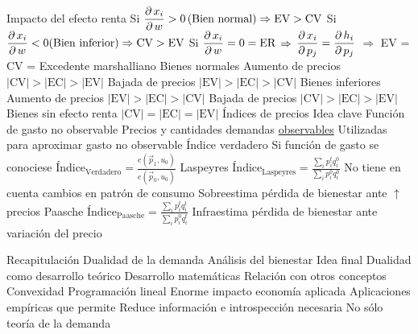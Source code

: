 \documentclass{nuevotema}
\begin{document}
\begin{esquemal}
			\3 Impacto del efecto renta
				\4 Si $\dfrac{\partial \, x_i}{\partial \, w} > 0 \, (\text{Bien normal}) \Rightarrow \text{EV} > \text{CV}$
				\4 Si $\dfrac{\partial \, x_i}{\partial \, w} < 0 (\text{Bien inferior}) \Rightarrow \text{CV} > \text{EV}$
				\4 Si $\dfrac{\partial \, x_i}{\partial \, w} = 0 = \text{ER}$
				\4[]$\Rightarrow$ $\dfrac{\partial \, x_i}{\partial \, p_j} = \dfrac{\partial \, h_i}{\partial \, p_j}$
				\4[] $\Rightarrow$ EV = CV = Excedente marshalliano
			\3 Bienes normales
				\4 Aumento de precios
				\4[] $\left| \text{CV} \right| > \left| \text{EC} \right| > \left| \text{EV} \right|$
				\4 Bajada de precios
				\4[] $\left| \text{EV} \right| > \left| \text{EC} \right| > \left| \text{CV} \right|$
			\3 Bienes inferiores
				\4 Aumento de precios
				\4[] $\left| \text{EV} \right| > \left| \text{EC} \right| > \left| \text{CV} \right|$
				\4 Bajada de precios
				\4[] $\left| \text{CV} \right| > \left| \text{EC} \right| > \left| \text{EV} \right|$
			\3 Bienes sin efecto renta
				\4[] $\left| \text{CV} \right| = \left| \text{EC} \right| = \left| \text{EV} \right|$
		\2 Índices de precios
			\3 Idea clave
				\4 Función de gasto no observable
				\4 Precios y cantidades demandas \underline{observables}
				\4[] Utilizadas para aproximar gasto no observable
			\3 Índice verdadero
				\4 Si función de gasto se conociese
				\4 $\text{Índice}_{\text{Verdadero}} = \frac{e(\vec{p}_1, u_0)}{e(\vec{p}_0, u_0)}$
			\3 Laspeyres
				\4 $\text{Índice}_{\text{Laspeyres}} =  \frac{\sum_i p_i^t q_i^0 }{\sum_i p_i^0 q_i^0}$
				\4 No tiene en cuenta cambios en patrón de consumo
				\4 Sobreestima pérdida de bienestar ante $\uparrow$ precios
			\3 Paasche
				\4 $\text{Índice}_{\text{Paasche}} = \frac{\sum_i p_i^t q_i^t}{\sum_i p_i^0 q_i^t}$
				\4 Infraestima pérdida de bienestar ante variación del precio

	\1[] 
		\2 Recapitulación
			\3 Dualidad de la demanda
			\3 Análisis del bienestar
		\2 Idea final
			\3 Dualidad como desarrollo teórico
				\4 Desarrollo matemáticas
				\4 Relación con otros conceptos
				\4[] Convexidad
				\4[] Programación lineal
			\3 Enorme impacto economía aplicada
				\4 Aplicaciones empíricas que permite
				\4 Reduce información e introspección necesaria
				\4 No sólo teoría de la demanda
\end{esquemal}

\conceptos

\end{document}
